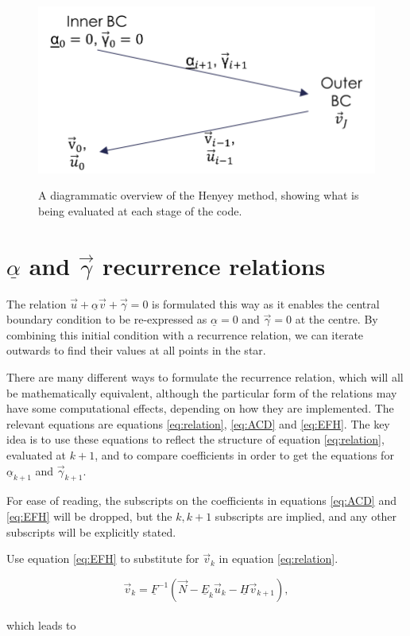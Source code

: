 \documentclass[11pt]{amsart}
\begin{document}
\begin{figure}
\begin{center}
\label{fig:overview}
\includegraphics[width = 0.5 \textwidth]{Overview.png}
\caption{A diagrammatic overview of the Henyey method, showing what is being evaluated at each stage of the code.}
\end{center}
\end{figure}







\section{$\underline{\alpha}$ and $\vec{\gamma}$ recurrence relations}

The relation $\vec{u} + \underline{\alpha} \vec{v} + \vec{\gamma} = 0$ is formulated this way as it enables the central boundary condition to be re-expressed as $\underline{\alpha} = 0$ and $\vec{\gamma} = 0$ at the centre.  By combining this initial condition with a recurrence relation, we can iterate outwards to find their values at all points in the star.

There are many different ways to formulate the recurrence relation, which will all be mathematically equivalent, although the particular form of the relations may have some computational effects, depending on how they are implemented.  The relevant equations are equations \ref{eq:relation}, \ref{eq:ACD} and \ref{eq:EFH}.  The key idea is to use these equations to reflect the structure of equation \ref{eq:relation}, evaluated at $k+1$, and to compare coefficients in order to get the equations for $\underline{\alpha}_{k+1}$ and $\vec{\gamma}_{k+1}$.

For ease of reading, the subscripts on the coefficients in equations \ref{eq:ACD} and \ref{eq:EFH} will be dropped, but the $k,k+1$ subscripts are implied, and any other subscripts will be explicitly stated.


Use equation \ref{eq:EFH} to substitute for $\vec{v}_{k}$ in equation \ref{eq:relation}.

\begin{equation} \label{eq:IIa}
\vec{v}_{k}  = \underline{F}^{-1}  \left( \vec{N} - \underline{E}_{k}  \vec{u}_{k}  - \underline{H} \vec{v}_{k+1} \right),
\end{equation}
\\
which leads to
\end{document}
